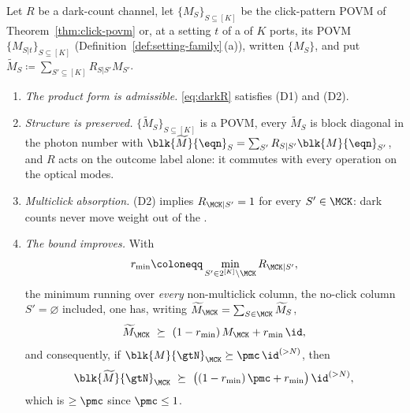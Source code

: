 \begin{theorem}\label{thm:dark-counts}
Let $R$ be a dark-count channel, let $\{M_S\}_{S\subseteq[K]}$ be the
click-pattern POVM of Theorem~\ref{thm:click-povm} or, at a setting $t$ of a
 of $K$ ports, its POVM $\{M_{S|t}\}_{S\subseteq[K]}$
(Definition~\ref{def:setting-family}\,(a)), written $\{M_S\}$, and put
$\widetilde{M}_S\coloneqq\sum_{S'\subseteq[K]}R_{S|S'}M_{S'}$.
\begin{enumerate}[label=(\roman*),leftmargin=3.0em]
\item \emph{The product form is admissible.} \eqref{eq:darkR} satisfies (D1)
  and (D2).
\item \emph{Structure is preserved.} $\{\widetilde M_S\}_{S\subseteq[K]}$ is a
  POVM, every $\widetilde M_S$ is block diagonal in the photon number with
  $\blk{\widetilde M}{\eqn}_S=\sum_{S'}R_{S|S'}\blk{M}{\eqn}_{S'}$, and $R$ acts
  on the outcome label alone: it commutes with every operation on the optical
  modes.
\item \emph{Multiclick absorption.} (D2) implies
  $R_{\MCK|S'}=1$ for every $S'\in\MCK$: dark counts never move weight out of
  the .
\item \emph{The bound improves.} With
  \begin{equation}\label{eq:rmin}
    r_{\min}\coloneqq\min_{S'\in2^{[K]}\setminus\MCK}R_{\MCK|S'} ,
  \end{equation}
  the minimum running over \emph{every} non-multiclick column, the no-click
  column $S'=\varnothing$ included,
  one has, writing $\widetilde M_{\MCK}=\sum_{S\in\MCK}\widetilde M_S$,
  \begin{equation}\label{eq:darkimprove}
    \widetilde M_{\MCK}\ \succeq\ (1-r_{\min})\,M_{\MCK}+r_{\min}\,\id ,
  \end{equation}
  and consequently, if $\blk{M}{\gtN}_{\MCK}\succeq\pmc\,\id^{(>N)}$, then
  \begin{equation}\label{eq:darkpmc}
    \blk{\widetilde M}{\gtN}_{\MCK}\ \succeq\
    \big((1-r_{\min})\,\pmc+r_{\min}\big)\,\id^{(>N)} ,
  \end{equation}
  which is $\ge\pmc$ since $\pmc\le1$.
\end{enumerate}
\end{theorem}

